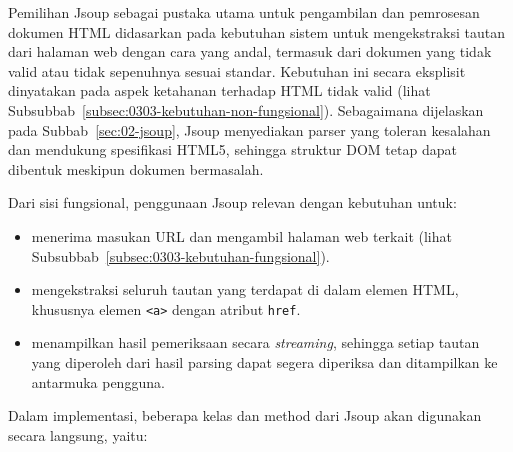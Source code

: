 
Pemilihan Jsoup sebagai pustaka utama untuk pengambilan dan pemrosesan dokumen HTML didasarkan pada kebutuhan sistem untuk mengekstraksi tautan dari halaman web dengan cara yang andal, termasuk dari dokumen yang tidak valid atau tidak sepenuhnya sesuai standar. Kebutuhan ini secara eksplisit dinyatakan pada aspek ketahanan terhadap HTML tidak valid (lihat Subsubbab~\ref{subsec:0303-kebutuhan-non-fungsional}). Sebagaimana dijelaskan pada Subbab~\ref{sec:02-jsoup}, Jsoup menyediakan parser yang toleran kesalahan dan mendukung spesifikasi HTML5, sehingga struktur DOM tetap dapat dibentuk meskipun dokumen bermasalah. 

Dari sisi fungsional, penggunaan Jsoup relevan dengan kebutuhan untuk:
\begin{itemize}
  \item menerima masukan URL dan mengambil halaman web terkait (lihat Subsubbab~\ref{subsec:0303-kebutuhan-fungsional}).
  \item mengekstraksi seluruh tautan yang terdapat di dalam elemen HTML, khususnya elemen \texttt{<a>} dengan atribut \texttt{href}.
  \item menampilkan hasil pemeriksaan secara \textit{streaming}, sehingga setiap tautan yang diperoleh dari hasil parsing dapat segera diperiksa dan ditampilkan ke antarmuka pengguna.
\end{itemize}

Dalam implementasi, beberapa kelas dan method dari Jsoup akan digunakan secara langsung, yaitu:


